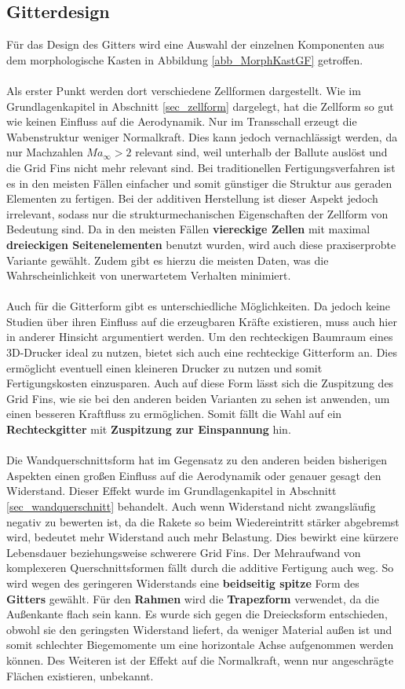 \subsection{Gitterdesign}
Für das Design des Gitters wird eine Auswahl der einzelnen Komponenten aus dem morphologische Kasten in Abbildung \ref{abb_MorphKastGF} getroffen.
\\~\\
Als erster Punkt werden dort verschiedene Zellformen dargestellt. Wie im Grundlagenkapitel in Abschnitt \ref{sec_zellform} dargelegt, hat die Zellform so gut wie keinen Einfluss auf die Aerodynamik. Nur im Transschall erzeugt die Wabenstruktur weniger Normalkraft. Dies kann jedoch vernachlässigt werden, da nur Machzahlen $Ma_\infty >2$ relevant sind, weil unterhalb der Ballute auslöst und die Grid Fins nicht mehr relevant sind. Bei traditionellen Fertigungsverfahren ist es in den meisten Fällen einfacher und somit günstiger die Struktur aus geraden Elementen zu fertigen. Bei der additiven Herstellung ist dieser Aspekt jedoch irrelevant, sodass nur die strukturmechanischen Eigenschaften der Zellform von Bedeutung sind. Da in den meisten Fällen \textbf{viereckige Zellen} mit maximal \textbf{dreieckigen Seitenelementen} benutzt wurden, wird auch diese praxiserprobte Variante gewählt. Zudem gibt es hierzu die meisten Daten, was die Wahrscheinlichkeit von unerwartetem Verhalten minimiert.
\\~\\
Auch für die Gitterform gibt es unterschiedliche Möglichkeiten. Da jedoch keine Studien über ihren Einfluss auf die erzeugbaren Kräfte existieren, muss auch hier in anderer Hinsicht argumentiert werden. Um den rechteckigen Baumraum eines 3D-Drucker ideal zu nutzen, bietet sich auch eine rechteckige Gitterform an. Dies ermöglicht eventuell einen kleineren Drucker zu nutzen und somit Fertigungskosten einzusparen. Auch auf diese Form lässt sich die Zuspitzung des Grid Fins, wie sie bei den anderen beiden Varianten zu sehen ist anwenden, um einen besseren Kraftfluss zu ermöglichen. Somit fällt die Wahl auf ein \textbf{Rechteckgitter} mit \textbf{Zuspitzung zur Einspannung} hin.
\\~\\
Die Wandquerschnittsform hat im Gegensatz zu den anderen beiden bisherigen Aspekten einen großen Einfluss auf die Aerodynamik oder genauer gesagt den Widerstand. Dieser Effekt wurde im Grundlagenkapitel in Abschnitt \ref{sec_wandquerschnitt} behandelt. Auch wenn Widerstand nicht zwangsläufig negativ zu bewerten ist, da die Rakete so beim Wiedereintritt stärker abgebremst wird, bedeutet mehr Widerstand auch mehr Belastung. Dies bewirkt eine kürzere Lebensdauer beziehungsweise schwerere Grid Fins. Der Mehraufwand von komplexeren Querschnittsformen fällt durch die additive Fertigung auch weg. So wird wegen des geringeren Widerstands eine \textbf{beidseitig spitze} Form des \textbf{Gitters} gewählt. Für den \textbf{Rahmen} wird die \textbf{Trapezform} verwendet, da die Außenkante flach sein kann. Es wurde sich gegen die Dreiecksform entschieden, obwohl sie den geringsten Widerstand liefert, da weniger Material außen ist und somit schlechter Biegemomente um eine horizontale Achse aufgenommen werden können. Des Weiteren ist der Effekt auf die Normalkraft, wenn nur angeschrägte Flächen existieren, unbekannt.
